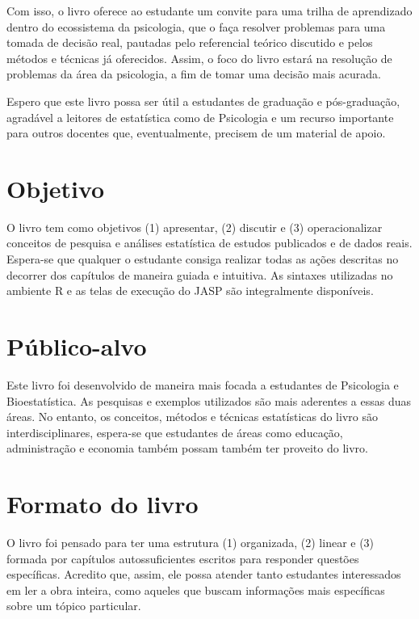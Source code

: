 \documentclass[
]{book}
\begin{document}
Com isso, o livro oferece ao estudante um convite para uma trilha de aprendizado dentro do ecossistema da psicologia, que o faça resolver problemas para uma tomada de decisão real, pautadas pelo referencial teórico discutido e pelos métodos e técnicas já oferecidos. Assim, o foco do livro estará na resolução de problemas da área da psicologia, a fim de tomar uma decisão mais acurada.

Espero que este livro possa ser útil a estudantes de graduação e pós-graduação, agradável a leitores de estatística como de Psicologia e um recurso importante para outros docentes que, eventualmente, precisem de um material de apoio.

\hypertarget{objetivo}{%
\section{Objetivo}\label{objetivo}}

O livro tem como objetivos (1) apresentar, (2) discutir e (3) operacionalizar conceitos de pesquisa e análises estatística de estudos publicados e de dados reais. Espera-se que qualquer o estudante consiga realizar todas as ações descritas no decorrer dos capítulos de maneira guiada e intuitiva. As sintaxes utilizadas no ambiente R e as telas de execução do JASP são integralmente disponíveis.

\hypertarget{puxfablico-alvo}{%
\section{Público-alvo}\label{puxfablico-alvo}}

Este livro foi desenvolvido de maneira mais focada a estudantes de Psicologia e Bioestatística. As pesquisas e exemplos utilizados são mais aderentes a essas duas áreas. No entanto, os conceitos, métodos e técnicas estatísticas do livro são interdisciplinares, espera-se que estudantes de áreas como educação, administração e economia também possam também ter proveito do livro.

\hypertarget{formato-do-livro}{%
\section{Formato do livro}\label{formato-do-livro}}

O livro foi pensado para ter uma estrutura (1) organizada, (2) linear e (3) formada por capítulos autossuficientes escritos para responder questões específicas. Acredito que, assim, ele possa atender tanto estudantes interessados em ler a obra inteira, como aqueles que buscam informações mais específicas sobre um tópico particular.
\end{document}
